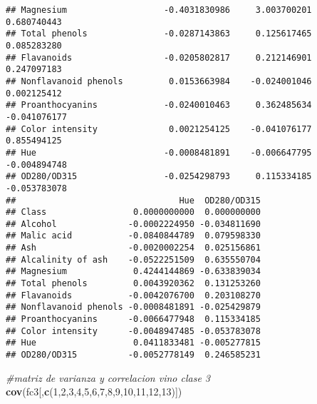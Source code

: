 \documentclass[
]{article}
\newenvironment{Shaded}{\begin{snugshade}}{\end{snugshade}}
\newcommand{\CommentTok}[1]{\textcolor[rgb]{0.56,0.35,0.01}{\textit{#1}}}
\newcommand{\DecValTok}[1]{\textcolor[rgb]{0.00,0.00,0.81}{#1}}
\newcommand{\KeywordTok}[1]{\textcolor[rgb]{0.13,0.29,0.53}{\textbf{#1}}}
\newcommand{\NormalTok}[1]{#1}
\begin{document}
\begin{verbatim}
## Magnesium                   -0.4031830986     3.003700201     0.680740443
## Total phenols               -0.0287143863     0.125617465     0.085283280
## Flavanoids                  -0.0205802817     0.212146901     0.247097183
## Nonflavanoid phenols         0.0153663984    -0.024001046     0.002125412
## Proanthocyanins             -0.0240010463     0.362485634    -0.041076177
## Color intensity              0.0021254125    -0.041076177     0.855494125
## Hue                         -0.0008481891    -0.006647795    -0.004894748
## OD280/OD315                 -0.0254298793     0.115334185    -0.053783078
##                                Hue  OD280/OD315
## Class                 0.0000000000  0.000000000
## Alcohol              -0.0002224950 -0.034811690
## Malic acid           -0.0840844789  0.079598330
## Ash                  -0.0020002254  0.025156861
## Alcalinity of ash    -0.0522251509  0.635550704
## Magnesium             0.4244144869 -0.633839034
## Total phenols         0.0043920362  0.131253260
## Flavanoids           -0.0042076700  0.203108270
## Nonflavanoid phenols -0.0008481891 -0.025429879
## Proanthocyanins      -0.0066477948  0.115334185
## Color intensity      -0.0048947485 -0.053783078
## Hue                   0.0411833481 -0.005277815
## OD280/OD315          -0.0052778149  0.246585231
\end{verbatim}

\begin{Shaded}
\begin{Highlighting}[]
\CommentTok{#matriz de varianza y correlacion vino clase 3}
\KeywordTok{cov}\NormalTok{(fc3[,}\KeywordTok{c}\NormalTok{(}\DecValTok{1}\NormalTok{,}\DecValTok{2}\NormalTok{,}\DecValTok{3}\NormalTok{,}\DecValTok{4}\NormalTok{,}\DecValTok{5}\NormalTok{,}\DecValTok{6}\NormalTok{,}\DecValTok{7}\NormalTok{,}\DecValTok{8}\NormalTok{,}\DecValTok{9}\NormalTok{,}\DecValTok{10}\NormalTok{,}\DecValTok{11}\NormalTok{,}\DecValTok{12}\NormalTok{,}\DecValTok{13}\NormalTok{)])}
\end{Highlighting}
\end{Shaded}
\end{document}
